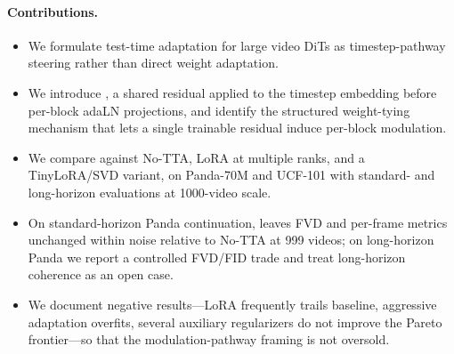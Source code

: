 \paragraph{Contributions.}
\begin{itemize}
  \item We formulate test-time adaptation for large video DiTs as
        timestep-pathway steering rather than direct weight adaptation.
  \item We introduce \method, a shared residual applied to the timestep
        embedding before per-block adaLN projections, and identify the
        structured weight-tying mechanism that lets a single trainable
        residual induce per-block modulation.
  \item We compare \method against No-TTA, LoRA at multiple ranks, and a
        TinyLoRA/SVD variant, on Panda-70M and UCF-101 with standard- and
        long-horizon evaluations at 1000-video scale.
  \item On standard-horizon Panda continuation, \method leaves FVD and
        per-frame metrics unchanged within noise relative to No-TTA at
        999 videos; on long-horizon Panda we
        report a controlled FVD/FID trade and treat long-horizon coherence
        as an open case.
  \item We document negative results---LoRA frequently trails baseline,
        aggressive adaptation overfits, several auxiliary regularizers do
        not improve the Pareto frontier---so that the modulation-pathway
        framing is not oversold.
\end{itemize}

